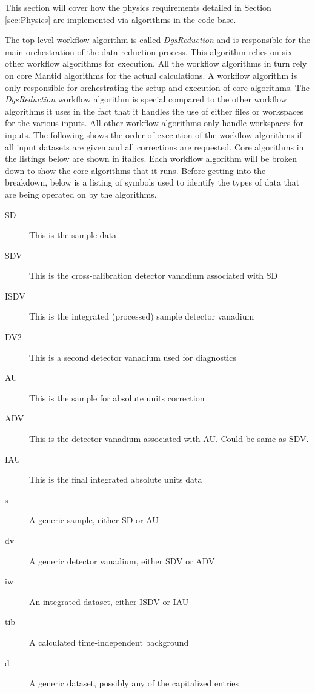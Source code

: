 This section will cover how the physics requirements detailed in Section \ref{sec:Physics} are implemented via algorithms in the \mantid{} code base.

The top-level workflow algorithm is called \textit{DgsReduction} and is responsible for the main orchestration of the data reduction process. This algorithm relies on six other workflow algorithms for execution. All the workflow algorithms in turn rely on core Mantid algorithms for the actual calculations. A workflow algorithm is only responsible for orchestrating the setup and execution of core \mantid{} algorithms. The \textit{DgsReduction} workflow algorithm is special compared to the other workflow algorithms it uses in the fact that it handles the use of either files or workspaces for the various inputs. All other workflow algorithms only handle workspaces for inputs. The following shows the order of execution of the workflow algorithms if all input datasets are given and all corrections are requested. Core \mantid{} algorithms in the listings below are shown in italics. Each workflow algorithm will be broken down to show the core algorithms that it runs. Before getting into the breakdown, below is a listing of symbols used to identify the types of data that are being operated on by the algorithms.

\begin{description}
\item[SD] This is the sample data
\item[SDV] This is the cross-calibration detector vanadium associated with SD
\item[ISDV] This is the integrated (processed) sample detector vanadium
\item[DV2] This is a second detector vanadium used for diagnostics
\item[AU] This is the sample for absolute units correction
\item[ADV] This is the detector vanadium associated with AU. Could be same as SDV.
\item[IAU] This is the final integrated absolute units data
\item[s] A generic sample, either SD or AU
\item[dv] A generic detector vanadium, either SDV or ADV
\item[iw] An integrated dataset, either ISDV or IAU
\item[tib] A calculated time-independent background
\item[d] A generic dataset, possibly any of the capitalized entries
\end{description}

